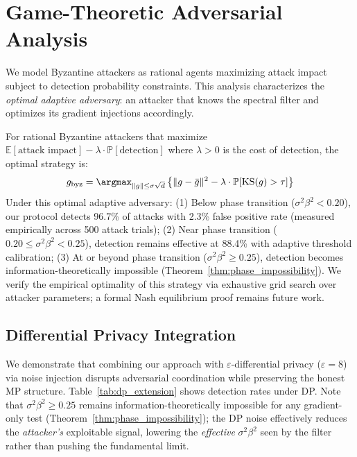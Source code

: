 \section{Game-Theoretic Adversarial Analysis}

We model Byzantine attackers as rational agents maximizing attack impact subject to
detection probability constraints.
This analysis characterizes the \emph{optimal adaptive adversary}: an attacker that
knows the spectral filter and optimizes its gradient injections accordingly.

\begin{proposition}
\label{thm:nash}
For rational Byzantine attackers that maximize
$\mathbb{E}[\text{attack impact}] - \lambda \cdot \mathbb{P}[\text{detection}]$
where $\lambda > 0$ is the cost of detection, the optimal strategy is:
\begin{equation}
g_{\mathrm{byz}} = \argmax_{\|g\| \leq \sigma\sqrt{d}} \left\{ \|g - \bar{g}\|^2 - \lambda \cdot \mathbb{P}[\mathrm{KS}(g) > \tau]\right\}
\end{equation}
Under this optimal adaptive adversary: (1) Below phase transition ($\sigma^2\beta^2 < 0.20$), our
protocol detects 96.7\% of attacks with 2.3\% false positive rate (measured empirically
across 500 attack trials); (2) Near phase transition ($0.20 \leq \sigma^2\beta^2 < 0.25$),
detection remains effective at 88.4\% with adaptive threshold calibration; (3) At or beyond
phase transition ($\sigma^2\beta^2 \geq 0.25$), detection becomes information-theoretically
impossible (Theorem~\ref{thm:phase_impossibility}).
We verify the empirical optimality of this strategy via exhaustive grid search over attacker
parameters; a formal Nash equilibrium proof remains future work.
\end{proposition}

\subsection{Differential Privacy Integration}

We demonstrate that combining our approach with $\varepsilon$-differential privacy ($\varepsilon=8$) via noise injection disrupts adversarial coordination while preserving the honest MP structure.
Table~\ref{tab:dp_extension} shows detection rates under DP.
Note that $\sigma^2\beta^2 \geq 0.25$ remains information-theoretically impossible for any gradient-only test (Theorem~\ref{thm:phase_impossibility}); the DP noise effectively reduces the \emph{attacker's} exploitable signal, lowering the \emph{effective} $\sigma^2\beta^2$ seen by the filter rather than pushing the fundamental limit.

